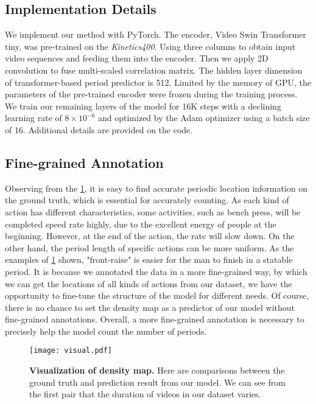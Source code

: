 \documentclass[10pt,twocolumn,letterpaper]{article}
\begin{document}
\subsection{Implementation Details}
We implement our method with PyTorch. The encoder, Video Swin Transformer tiny\cite{video-swin-transformer}, was pre-trained on the \emph{Kinetics400}. Using three columns to obtain input video sequences and feeding them into the encoder. Then we apply 2D convolution to fuse multi-scaled correlation matrix. The hidden layer dimension of transformer-based period predictor is 512. Limited by the memory of GPU, the parameters of the pre-trained encoder were frozen during the training process. We train our remaining layers of the model for 16K steps with a declining learning rate of $8\times 10^{-6}$ and optimized by the Adam optimizer using a batch size of 16. Additional details are provided on the code.

\subsection{Fine-grained Annotation}
Observing from the \cref{fig:visual}, it is easy to find accurate periodic location information on the ground truth, which is essential for accurately counting. As each kind of action has different characteristics, some activities, such as bench press, will be completed speed rate highly, due to the excellent energy of people at the beginning. However, at the end of the action, the rate will slow down. On the other hand, the period length of specific actions can be more uniform. As the examples of \cref{fig:visual} shown, "front-raise" is easier for the man to finish in a statable period. It is because we annotated the data in a more fine-grained way, by which we can get the locations of all kinds of actions from our dataset, we have the opportunity to fine-tune the structure of the model for different needs. Of course, there is no chance to set the density map as a predictor of our model without fine-grained annotations. Overall, a more fine-grained annotation is necessary to precisely help the model count the number of periods.  

\begin{figure}[ht]
\centering

\centerline{\texttt{[image: visual.pdf]}}\caption{
\textbf{Visualization of density map.}
Here are comparisons between the ground truth and prediction result from our model. We can see from the first pair that the duration of videos in our dataset varies.  }
\label{fig:visual}
\end{figure}
\end{document}
